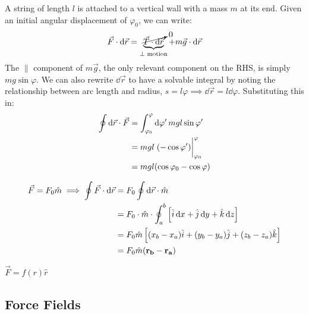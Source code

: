 \documentclass[12pt]{article}
\begin{document}
\begin{example}
  A string of length $l$ is attached to a vertical wall with a mass $m$ at its end. Given an initial angular displacement of $\varphi_0$, we can write:
  \begin{align*}
    \vec{F} \cdot \dd{\vec{r}} &= \underbrace{\cancelto{0}{\vec{T}\cdot \dd{\vec{r}}}}_{\perp \text{ motion}} + m \vec{g} \cdot \dd{\vec{r}}\\
  \end{align*}
  The $\parallel$ component of $m\vec{g}$, the only relevant component on the RHS, is simply $m g \sin \varphi$. We can also rewrite $\dd{\vec{r}}$ to have a solvable integral by noting the relationship between arc length and radius, $s = l \varphi \implies \dd{\vec{r}} = l \dd{\varphi}$. Substituting this in:
  \begin{align*}
    \oint \dd{\vec{r}}\cdot \vec{F} &= \int_{\varphi_0}^\varphi \dd{\varphi'} m g l \sin \varphi'\\
    &= mgl \eval{(-\cos \varphi')}_{\varphi_0}^{\varphi}\\
    &= mgl(\cos \varphi_0 - \cos \varphi)
  \end{align*}
\end{example}

\begin{example}
  \begin{align*}
    \vec{F} = F_0 \hat{m} \implies \oint \vec{F} \cdot \dd{\vec{r}} &= F_0 \oint \dd{\vec{r}}\cdot \hat{m}\\
    &= F_0 \cdot \hat{m} \cdot \oint_a^b \left[\hat{i} \dd{x} + \hat{j} \dd{y} + \hat{k} \dd{z}\right]\\
    &= F_0 \hat{m}\left[(x_b-x_a)\hat{i} + (y_b-y_a)\hat{j} + (z_b-z_a)\hat{k}\right]\\
    &= F_0 \hat{m}(\vb{r_b} - \vb{r_a})
  \end{align*}
\end{example}

\begin{example}
  $\vec{F} = f(r) \hat{r}$
\end{example}

\subsection{Force Fields}
\end{document}
